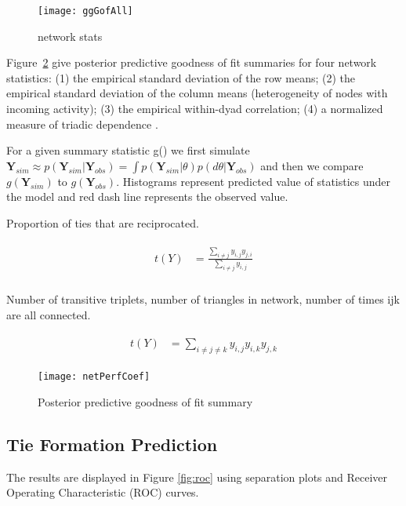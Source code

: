 \begin{figure}[ht]
	\centering
	\texttt{[image: ggGofAll]}
	\caption{network stats }
	\label{fig:gofAll}
\end{figure}

Figure~\ref{fig:ergmAmePerf} give posterior predictive goodness of fit summaries for four network statistics: (1) the empirical standard deviation of the row means; (2) the empirical standard deviation of the column means (heterogeneity of nodes with incoming activity); (3) the empirical within-dyad correlation; (4) a normalized measure of triadic dependence \citep{hoff:etal:2015}. 

For a given summary statistic g() we first simulate $\mathbf{Y}_{sim} \approx p(\mathbf{Y}_{sim} | \mathbf{Y}_{obs}) = \int p(\mathbf{Y}_{sim} | \theta) p(d \theta | \mathbf{Y}_{obs})$ and then we compare $g(\mathbf{Y}_{sim})$ to $g(\mathbf{Y}_{obs})$. Histograms represent predicted value of statistics under the model and red dash line represents the observed value. 

Proportion of ties that are reciprocated. 

\begin{align}
\begin{aligned}
t(Y) &= \frac{ \sum_{i \neq j}y_{i,j} y_{j,i} }{ \sum_{i \neq j} y_{i,j} } \\
\end{aligned}
\end{align}

Number of transitive triplets, number of triangles in network, number of times ijk are all connected.

\begin{align}
\begin{aligned}
t(Y) &= \sum_{i \neq j \neq k} y_{i,j} y_{i,k} y_{j,k}
\end{aligned}
\end{align}

\begin{figure}[ht]
	\centering
	\texttt{[image: netPerfCoef]}
	\caption{Posterior predictive goodness of fit summary}
	\label{fig:ergmAmePerf}
\end{figure}

\subsection{Tie Formation Prediction}

The results are displayed in Figure \ref{fig:roc} using separation plots and Receiver Operating Characteristic (ROC) curves.

